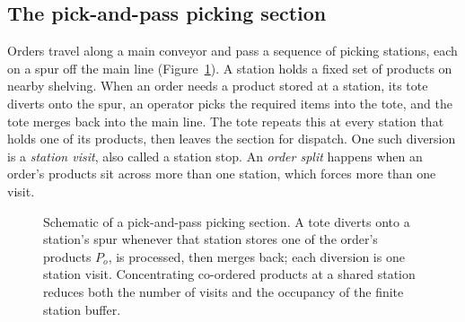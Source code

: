 \documentclass[]{interact}
\begin{document}
\subsection{The pick-and-pass picking section}
Orders travel along a main conveyor and pass a sequence of picking stations, each on a spur off the main line (Figure~\ref{fig:schematic}). A station holds a fixed set of products on nearby shelving. When an order needs a product stored at a station, its tote diverts onto the spur, an operator picks the required items into the tote, and the tote merges back into the main line. The tote repeats this at every station that holds one of its products, then leaves the section for dispatch. One such diversion is a \emph{station visit}, also called a station stop. An \emph{order split} happens when an order's products sit across more than one station, which forces more than one visit.

\begin{figure}[t]
\centering
{}
\caption{Schematic of a pick-and-pass picking section. A tote diverts onto a station's spur whenever that station stores one of the order's products $P_o$, is processed, then merges back; each diversion is one station visit. Concentrating co-ordered products at a shared station reduces both the number of visits and the occupancy of the finite station buffer.}
\label{fig:schematic}
\end{figure}
\end{document}
